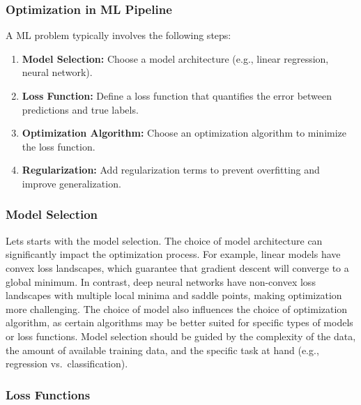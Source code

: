 \documentclass[
  letterpaper,
  DIV=11,
  numbers=noendperiod]{scrreprt}
\providecommand{\tightlist}{%
  \setlength{\itemsep}{0pt}\setlength{\parskip}{0pt}}
\begin{document}
\subsubsection{Optimization in ML
Pipeline}\label{optimization-in-ml-pipeline}

A ML problem typically involves the following steps:

\begin{enumerate}
\def\labelenumi{\arabic{enumi}.}
\tightlist
\item
  \textbf{Model Selection:} Choose a model architecture (e.g., linear
  regression, neural network).
\item
  \textbf{Loss Function:} Define a loss function that quantifies the
  error between predictions and true labels.
\item
  \textbf{Optimization Algorithm:} Choose an optimization algorithm to
  minimize the loss function.
\item
  \textbf{Regularization:} Add regularization terms to prevent
  overfitting and improve generalization.
\end{enumerate}

\subsubsection{Model Selection}\label{model-selection}

Lets starts with the model selection. The choice of model architecture
can significantly impact the optimization process. For example, linear
models have convex loss landscapes, which guarantee that gradient
descent will converge to a global minimum. In contrast, deep neural
networks have non-convex loss landscapes with multiple local minima and
saddle points, making optimization more challenging. The choice of model
also influences the choice of optimization algorithm, as certain
algorithms may be better suited for specific types of models or loss
functions. Model selection should be guided by the complexity of the
data, the amount of available training data, and the specific task at
hand (e.g., regression vs.~classification).

\subsubsection{Loss Functions}\label{loss-functions}
\end{document}
